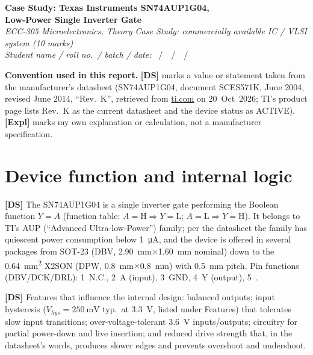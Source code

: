 \documentclass[11pt,a4paper]{article}
\newcommand{\DS}{\textbf{[DS]}}
\newcommand{\Expl}{\textbf{[Expl]}}
\begin{document}
\begin{center}
  {\LARGE\bfseries Case Study: Texas Instruments SN74AUP1G04,\\Low-Power Single Inverter Gate}\\[8pt]
  {\itshape ECC-305 Microelectronics, Theory Case Study: commercially available IC / VLSI system (10 marks)}\\[6pt]
  {\itshape Student name / roll no.\ / batch / date:}
  \fillfield{\StudentName}{3cm}\ /\ \fillfield{\RollNo}{2cm}\ /\ \fillfield{\Batch}{2cm}\ /\ \fillfield{\SubmissionDate}{2cm}
\end{center}

\textbf{Convention used in this report.} \DS{} marks a value or statement taken from the manufacturer's datasheet (SN74AUP1G04, document SCES571K, June 2004, revised June 2014, ``Rev.~K'', retrieved from \href{https://www.ti.com/lit/gpn/SN74AUP1G04}{ti.com} on 20~Oct~2026; TI's product page lists Rev.~K as the current datasheet and the device status as ACTIVE). \Expl{} marks my own explanation or calculation, not a manufacturer specification.

\section{Device function and internal logic}
\DS{} The SN74AUP1G04 is a single inverter gate performing the Boolean function $Y=\overline{A}$ (function table: $A=\mathrm{H}\Rightarrow Y=\mathrm{L}$; $A=\mathrm{L}\Rightarrow Y=\mathrm{H}$). It belongs to TI's AUP (``Advanced Ultra-low-Power'') family; per the datasheet the family has quiescent power consumption below \SI{1}{\micro\ampere}, and the device is offered in several packages from SOT-23 (DBV, \SI{2.90}{\milli\meter}$\times$\SI{1.60}{\milli\meter} nominal) down to the \SI{0.64}{\milli\meter\squared} X2SON (DPW, \SI{0.8}{\milli\meter}$\times$\SI{0.8}{\milli\meter}) with \SI{0.5}{\milli\meter} pitch. Pin functions (DBV/DCK/DRL): 1~N.C., 2~A (input), 3~GND, 4~Y (output), 5~\Vcc.

\DS{} Features that influence the internal design: balanced outputs; input hysteresis ($V_{hys}=\SI{250}{\milli\volt}$ typ.\ at \SI{3.3}{\volt}, listed under Features) that tolerates slow input transitions; over-voltage-tolerant \SI{3.6}{\volt} inputs/outputs; \Ioff{} circuitry for partial power-down and live insertion; and reduced drive strength that, in the datasheet's words, produces slower edges and prevents overshoot and undershoot.
\end{document}
